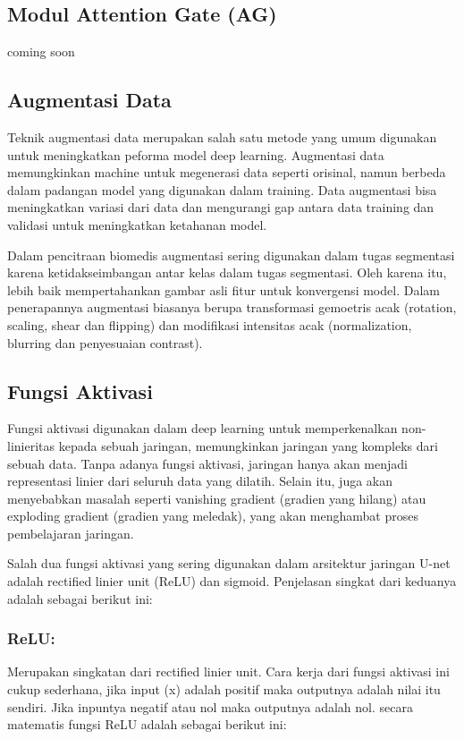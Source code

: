 \subsection{Modul Attention Gate (AG)}

coming soon

\subsection{Augmentasi Data}

\noindent Teknik augmentasi data merupakan salah satu metode yang umum digunakan untuk meningkatkan peforma model deep learning. Augmentasi data memungkinkan machine untuk megenerasi data seperti orisinal, namun berbeda dalam padangan model yang digunakan dalam training. Data augmentasi bisa meningkatkan variasi dari data dan mengurangi gap antara data training dan validasi  untuk meningkatkan ketahanan model.

\noindent Dalam pencitraan biomedis augmentasi sering digunakan dalam tugas segmentasi karena ketidakseimbangan antar kelas dalam tugas segmentasi. Oleh karena itu, lebih baik mempertahankan gambar asli fitur untuk konvergensi model. Dalam penerapannya augmentasi biasanya berupa transformasi gemoetris acak (rotation, scaling, shear dan flipping) dan modifikasi intensitas acak (normalization, blurring dan penyesuaian contrast).


\subsection{Fungsi Aktivasi}

\noindent Fungsi aktivasi digunakan dalam deep learning untuk memperkenalkan non-linieritas kepada sebuah jaringan, memungkinkan jaringan yang kompleks dari sebuah data. Tanpa adanya fungsi aktivasi, jaringan hanya akan menjadi representasi linier dari seluruh data yang dilatih. Selain itu, juga akan menyebabkan masalah seperti vanishing gradient (gradien yang hilang) atau exploding gradient (gradien yang meledak), yang akan menghambat proses pembelajaran jaringan. 

\noindent Salah dua fungsi aktivasi yang sering digunakan dalam arsitektur jaringan U-net adalah rectified linier unit (ReLU) dan sigmoid. Penjelasan singkat dari keduanya adalah sebagai berikut ini:

\subsubsection{ReLU:}
Merupakan singkatan dari rectified linier unit. Cara kerja dari fungsi aktivasi ini cukup sederhana, jika input (x) adalah positif maka outputnya adalah nilai itu sendiri. Jika inpuntya negatif atau nol maka outputnya adalah nol. secara matematis fungsi ReLU adalah sebagai berikut ini: 

